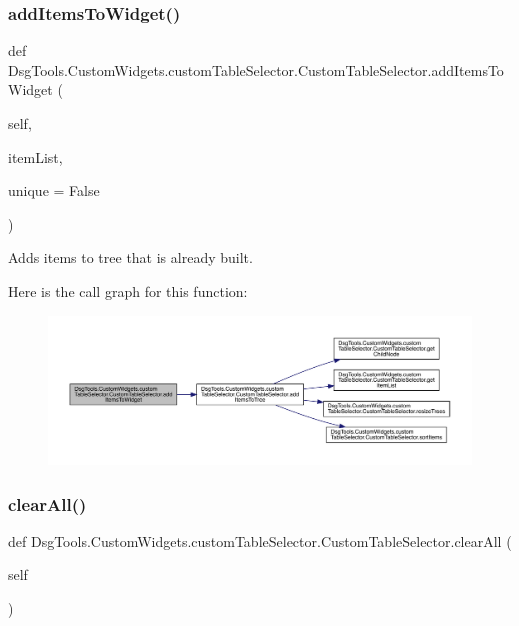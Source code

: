 \subsubsection{\texorpdfstring{add\+Items\+To\+Widget()}{addItemsToWidget()}}
{\footnotesize\ttfamily def Dsg\+Tools.\+Custom\+Widgets.\+custom\+Table\+Selector.\+Custom\+Table\+Selector.\+add\+Items\+To\+Widget (\begin{DoxyParamCaption}\item[{}]{self,  }\item[{}]{item\+List,  }\item[{}]{unique = {\ttfamily False} }\end{DoxyParamCaption})}

\begin{DoxyVerb}Adds items to tree that is already built.
\end{DoxyVerb}
 Here is the call graph for this function\+:
\nopagebreak
\begin{figure}[H]
\begin{center}
\leavevmode
\includegraphics[width=350pt]{class_dsg_tools_1_1_custom_widgets_1_1custom_table_selector_1_1_custom_table_selector_a58bd65d3468ed434e497e63fc2677ffa_cgraph}
\end{center}
\end{figure}
\mbox{\label{class_dsg_tools_1_1_custom_widgets_1_1custom_table_selector_1_1_custom_table_selector_a2b433744fb735a74d20fb729bf188f6d}} 
\subsubsection{\texorpdfstring{clear\+All()}{clearAll()}}
{\footnotesize\ttfamily def Dsg\+Tools.\+Custom\+Widgets.\+custom\+Table\+Selector.\+Custom\+Table\+Selector.\+clear\+All (\begin{DoxyParamCaption}\item[{}]{self }\end{DoxyParamCaption})}

